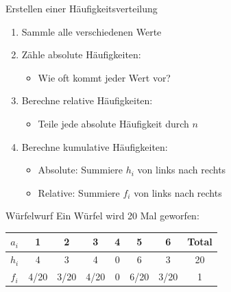 \begin{KR}{Erstellen einer Häufigkeitsverteilung}
\begin{enumerate}
    \item Sammle alle verschiedenen Werte
    \item Zähle absolute Häufigkeiten:
        \begin{itemize}
            \item Wie oft kommt jeder Wert vor?
        \end{itemize}
    \item Berechne relative Häufigkeiten:
        \begin{itemize}
            \item Teile jede absolute Häufigkeit durch $n$
        \end{itemize}
    \item Berechne kumulative Häufigkeiten:
        \begin{itemize}
            \item Absolute: Summiere $h_i$ von links nach rechts
            \item Relative: Summiere $f_i$ von links nach rechts
        \end{itemize}
\end{enumerate}
\end{KR}

\begin{example2}{Würfelwurf}
Ein Würfel wird 20 Mal geworfen:

\begin{center}
\begin{tabular}{|c|c|c|c|c|c|c|c|}
\hline
$a_i$ & 1 & 2 & 3 & 4 & 5 & 6 & Total \\
\hline 
$h_i$ & 4 & 3 & 4 & 0 & 6 & 3 & 20 \\
\hline
$f_i$ & 4/20 & 3/20 & 4/20 & 0 & 6/20 & 3/20 & 1 \\
\hline
\end{tabular}
\end{center}
\end{example2}

